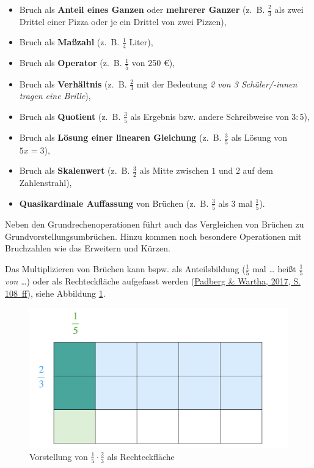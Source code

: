 \documentclass[
]{scrbook}
\providecommand{\tightlist}{%
  \setlength{\itemsep}{0pt}\setlength{\parskip}{0pt}}
\theoremstyle{definition}
\theoremstyle{definition}
\theoremstyle{definition}
\theoremstyle{definition}
\theoremstyle{remark}
\begin{document}
\begin{itemize}
\tightlist
\item
  Bruch als \textbf{Anteil eines Ganzen} oder \textbf{mehrerer Ganzer}
  (z.~B. \(\frac{2}{3}\) als zwei Drittel einer Pizza oder je ein Drittel von zwei Pizzen),
\item
  Bruch als \textbf{Maßzahl}
  (z.~B. \(\frac{1}{4}\) Liter),
\item
  Bruch als \textbf{Operator}
  (z.~B. \(\frac{1}{5}\) von 250 €),
\item
  Bruch als \textbf{Verhältnis}
  (z.~B. \(\frac{2}{3}\) mit der Bedeutung \emph{2 von 3 Schüler/-innen tragen eine Brille}),
\item
  Bruch als \textbf{Quotient}
  (z.~B. \(\frac{3}{5}\) als Ergebnis bzw. andere Schreibweise von \(3:5\)),
\item
  Bruch als \textbf{Lösung einer linearen Gleichung}
  (z.~B. \(\frac{3}{5}\) als Lösung von \(5x = 3\)),
\item
  Bruch als \textbf{Skalenwert}
  (z.~B. \(\frac{3}{2}\) als Mitte zwischen \(1\) und \(2\) auf dem Zahlenstrahl),
\item
  \textbf{Quasikardinale Auffassung} von Brüchen
  (z.~B. \(\frac{3}{5}\) als 3 mal \(\frac{1}{5}\)).
\end{itemize}

Neben den Grundrechenoperationen führt auch das Vergleichen von Brüchen zu Grundvorstellungsumbrüchen. Hinzu kommen noch besondere Operationen mit Bruchzahlen wie das Erweitern und Kürzen.

Das Multiplizieren von Brüchen kann bspw. als Anteilsbildung (\(\frac{1}{5}\) mal \ldots{} heißt \(\frac{1}{5}\) \emph{von} \ldots) oder als Rechteckfläche aufgefasst werden (\protect\hyperlink{ref-Padberg:2017}{Padberg \& Wartha, 2017, S. 108~ff}), siehe Abbildung \ref{fig:Bruchmultiplikation}.

\begin{figure}

{\centering \includegraphics[width=0.5\linewidth]{pictures/3-Bruchmulti} 

}

\caption{Vorstellung von $\frac{1}{5} \cdot \frac{2}{3}$ als Rechteckfläche}\label{fig:Bruchmultiplikation}
\end{figure}
\end{document}
